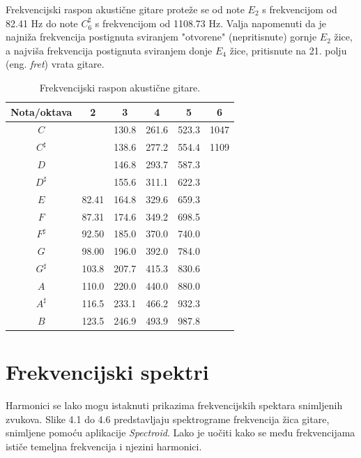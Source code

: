 \documentclass[times, utf8, zavrsni, numeric]{fer}
\begin{document}
Frekvencijski raspon akustične gitare proteže se od note $E_2$ s frekvencijom od 82.41 Hz do note $C_6^\sharp$ s frekvencijom od 1108.73 Hz. Valja napomenuti da je najniža frekvencija postignuta sviranjem "otvorene" (nepritisnute) gornje $E_2$ žice, a najviša frekvencija postignuta sviranjem donje $E_4$ žice, pritisnute na 21. polju (eng. \textit{fret}) vrata gitare.

\clearpage

\begin{table}
	\begin{center}
		\begin{tabular}{c|c c c c c}
			Nota/oktava  & 2 & 3 & 4 & 5 & 6\\
			\hline
			$C$ & & 130.8 & 261.6 & 523.3 & 1047\\
			\hline
			$C^\sharp$ &  & 138.6 & 277.2 & 554.4 & 1109\\
			\hline
			$D$ & & 146.8 & 293.7 & 587.3 & \\
			\hline
			$D^\sharp$ & & 155.6 & 311.1 & 622.3 & \\
			\hline
			$E$ & 82.41 & 164.8 & 329.6 & 659.3 & \\
			\hline
			$F$ & 87.31 &174.6 & 349.2 & 698.5 & \\
			\hline
			$F^\sharp$ & 92.50 & 185.0 & 370.0 & 740.0 & \\
			\hline
			$G$ & 98.00 & 196.0 & 392.0 & 784.0 & \\
			\hline
			$G^\sharp$ & 103.8 & 207.7 & 415.3 & 830.6 & \\
			\hline
			$A$ & 110.0 & 220.0 & 440.0 & 880.0 & \\
			\hline
			$A^\sharp$ & 116.5 & 233.1 & 466.2 & 932.3 & \\
			\hline
			$B$ & 123.5 & 246.9 & 493.9 & 987.8 & \\
		\end{tabular}
		\caption{Frekvencijski raspon akustične gitare.}
	\end{center}
\end{table}

\section{Frekvencijski spektri}
Harmonici se lako mogu istaknuti prikazima frekvencijskih spektara snimljenih zvukova. Slike 4.1 do 4.6 predstavljaju spektrograme frekvencija žica gitare, snimljene pomoću aplikacije \textit{Spectroid}. Lako je uočiti kako se među frekvencijama ističe temeljna frekvencija i njezini harmonici.
\end{document}
